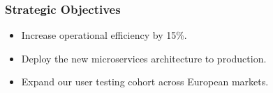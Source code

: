 \documentclass{beamer}
\begin{document}
\begin{frame}
\frametitle{Strategic Objectives}
\begin{itemize}
\item Increase operational efficiency by 15\%.
\item Deploy the new microservices architecture to production.
\item Expand our user testing cohort across European markets.
\end{itemize}
\end{frame}
\end{document}
